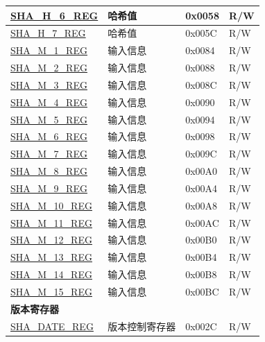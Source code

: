 \begin{longtable}{ | l| p{7.5cm} | p{1.3cm} | p{1cm} | }
\hyperref[regdesc:SHAHNREG]{SHA\_H\_6\_REG} & 哈希值 & 0x0058 & R/W \\ \hline
\hyperref[regdesc:SHAHNREG]{SHA\_H\_7\_REG} & 哈希值 & 0x005C & R/W \\ \hline
\hyperref[regdesc:SHAMNREG]{SHA\_M\_1\_REG} & 输入信息 & 0x0084 & R/W \\ \hline
\hyperref[regdesc:SHAMNREG]{SHA\_M\_2\_REG} & 输入信息 & 0x0088 & R/W \\ \hline
\hyperref[regdesc:SHAMNREG]{SHA\_M\_3\_REG} & 输入信息 & 0x008C & R/W \\ \hline
\hyperref[regdesc:SHAMNREG]{SHA\_M\_4\_REG} & 输入信息 & 0x0090 & R/W \\ \hline
\hyperref[regdesc:SHAMNREG]{SHA\_M\_5\_REG} & 输入信息 & 0x0094 & R/W \\ \hline
\hyperref[regdesc:SHAMNREG]{SHA\_M\_6\_REG} & 输入信息 & 0x0098 & R/W \\ \hline
\hyperref[regdesc:SHAMNREG]{SHA\_M\_7\_REG} & 输入信息 & 0x009C & R/W \\ \hline
\hyperref[regdesc:SHAMNREG]{SHA\_M\_8\_REG} & 输入信息 & 0x00A0 & R/W \\ \hline
\hyperref[regdesc:SHAMNREG]{SHA\_M\_9\_REG} & 输入信息 & 0x00A4 & R/W \\ \hline
\hyperref[regdesc:SHAMNREG]{SHA\_M\_10\_REG} & 输入信息 & 0x00A8 & R/W \\ \hline
\hyperref[regdesc:SHAMNREG]{SHA\_M\_11\_REG} & 输入信息 & 0x00AC & R/W \\ \hline
\hyperref[regdesc:SHAMNREG]{SHA\_M\_12\_REG} & 输入信息 & 0x00B0 & R/W \\ \hline
\hyperref[regdesc:SHAMNREG]{SHA\_M\_13\_REG} & 输入信息 & 0x00B4 & R/W \\ \hline
\hyperref[regdesc:SHAMNREG]{SHA\_M\_14\_REG} & 输入信息 & 0x00B8 & R/W \\ \hline
\hyperref[regdesc:SHAMNREG]{SHA\_M\_15\_REG} & 输入信息 & 0x00BC & R/W \\ \hline
\multicolumn{4}{|l|}{\textbf{版本寄存器}} \\ \hline
\hyperref[regdesc:SHADATEREG]{SHA\_DATE\_REG} & 版本控制寄存器 & 0x002C & R/W \\ \hline

\end{longtable}
